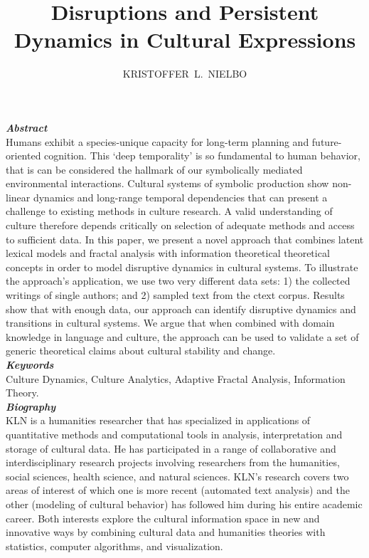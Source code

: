 \documentclass{article}
\title{Disruptions and Persistent Dynamics in Cultural Expressions}
\author{{KRISTOFFER~L.~NIELBO}}
\begin{document}
\maketitle

\textbf{\textit{Abstract}}\\
Humans exhibit a species-unique capacity for long-term planning and future-oriented cognition. This `deep temporality' is so fundamental to human behavior, that is can be considered the hallmark of our symbolically mediated environmental interactions. Cultural systems of symbolic production show non-linear dynamics and long-range temporal dependencies that can present a challenge to existing methods in culture research. A valid understanding of culture therefore depends critically on selection of adequate methods and access to sufficient data. In this paper, we present a novel approach that combines latent lexical models and fractal analysis with information theoretical theoretical concepts in order to model disruptive dynamics in cultural systems. To illustrate the approach's application, we use two very different data sets: 1) the collected writings of single authors; and  2) sampled text from the ctext corpus. Results show that with enough data, our approach can identify disruptive dynamics and transitions in cultural systems. We argue that when combined with domain knowledge in language and culture, the approach can be used to validate a set of generic theoretical claims about cultural stability and change.\\

\medskip
\textbf{\textit{Keywords}}\\
Culture Dynamics, Culture Analytics, Adaptive Fractal Analysis, Information Theory.\\ 

\medskip
\textbf{\textit{Biography}}\\

KLN is a humanities researcher that has specialized in applications of quantitative methods and computational tools in analysis, interpretation and storage of cultural data. He has participated in a range of collaborative and interdisciplinary research projects involving researchers from the humanities, social sciences, health science, and natural sciences. KLN's research covers two areas of interest of which one is more recent (automated text analysis) and the other (modeling of cultural behavior) has followed him during his entire academic career. Both interests explore the cultural information space in new and innovative ways by combining cultural data and humanities theories with statistics, computer algorithms, and visualization.
\end{document}
